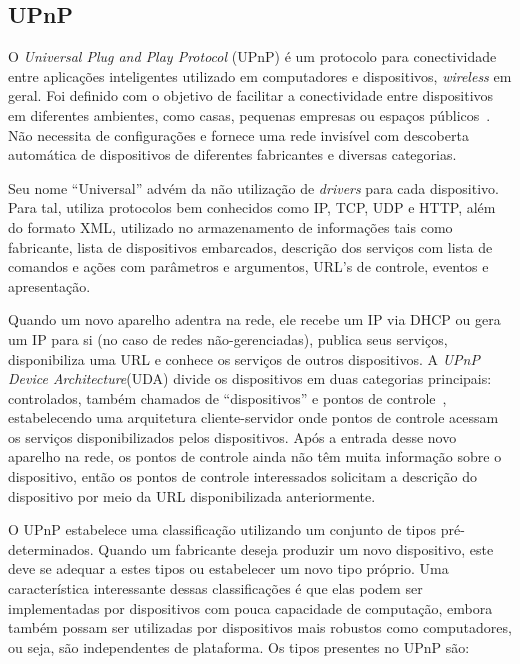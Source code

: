\subsection{UPnP}
\label{subsec:upnp}
O \emph{Universal Plug and Play Protocol} (UPnP) é um protocolo para conectividade entre aplicações inteligentes utilizado em computadores e dispositivos, \emph{wireless} em geral. Foi definido com o objetivo de facilitar a conectividade entre dispositivos em diferentes ambientes, como casas, pequenas empresas ou espaços públicos~\cite{upnpArch}. Não necessita de configurações e fornece uma rede invisível com descoberta automática de dispositivos de diferentes fabricantes e diversas categorias.

Seu nome ``Universal'' advém da não utilização de \emph{drivers} para cada dispositivo. Para tal, utiliza protocolos bem conhecidos como IP, TCP, UDP e HTTP, além do formato XML, utilizado no armazenamento de informações tais como fabricante, lista de dispositivos embarcados, descrição dos serviços com lista de comandos e ações com parâmetros e argumentos, URL's de controle, eventos e apresentação.

Quando um novo aparelho adentra na rede, ele recebe um IP via DHCP ou gera um IP para si (no caso de redes não-gerenciadas), publica seus serviços, disponibiliza uma URL e conhece os serviços de outros dispositivos. A \emph{UPnP Device Architecture}(UDA) divide os dispositivos em duas categorias principais: controlados, também chamados de ``dispositivos'' e pontos de controle~\cite{upnpArch}, estabelecendo uma arquitetura cliente-servidor onde pontos de controle acessam os serviços disponibilizados pelos dispositivos. Após a entrada desse novo aparelho na rede, os pontos de controle ainda não têm muita informação sobre o dispositivo, então os pontos de controle interessados solicitam a descrição do dispositivo por meio da URL disponibilizada anteriormente.

O UPnP estabelece uma classificação utilizando um conjunto de tipos pré-determinados. Quando um fabricante deseja produzir um novo dispositivo, este deve se adequar a estes tipos ou estabelecer um novo tipo próprio. Uma característica interessante dessas classificações é que elas podem ser implementadas por dispositivos com pouca capacidade de computação, embora também possam ser utilizadas por dispositivos mais robustos como computadores, ou seja, são independentes de plataforma. Os tipos presentes no UPnP são:

